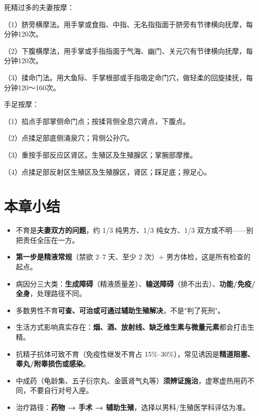 \documentclass[12pt,UTF8,openany]{ctexbook}
\begin{document}
死精过多的夫妻按摩：

（1）脐旁横摩法。用手掌或食指、中指、无名指指面于脐旁有节律横向抚摩，每分钟120次。

（2）下腹横摩法，用手掌或手指指面于气海、幽门、关元穴有节律横向抚摩，每分钟120次。

（3）揉命门法。用大鱼际、手掌根部或手指吸定命门穴，做轻柔的回旋揉抚，每分钟120～160次。

手足按摩：

（1）掐点手部掌侧命门点；按揉背侧全息穴肾点，下腹点。

（2）点揉足部底侧涌泉穴；背侧公孙穴。

（3）重按手部反应区肾区。生殖区及生殖腺区；掌腕部摩推。

（4）点揉足部反射区生殖区及生殖腺区，肾区；踩足底；擦足心。

\section{本章小结}

\begin{itemize}[leftmargin=2em,itemsep=0.3em]
  \item 不育是\textbf{夫妻双方的问题}，约 1/3 纯男方、1/3 纯女方、1/3 双方或不明——别把责任全压在一方。
  \item \textbf{第一步是精液常规}（禁欲 2–7 天、至少 2 次）+ 男方体检，这是所有检查的起点。
  \item 病因分三大类：\textbf{生成障碍}（精液质量差）、\textbf{输送障碍}（排不出去）、\textbf{功能/免疫/全身}，处理路径不同。
  \item 多数男性不育\textbf{可查、可治或可通过辅助生殖解决}，不是"判了死刑"。
  \item 生活方式影响真实存在：\textbf{烟、酒、放射线、缺乏维生素与微量元素}都会打击生精。
  \item 抗精子抗体可致不育（免疫性继发不育占 15\%–30\%），常见诱因是\textbf{精道阻塞、睾丸/附睾损伤或感染}。
  \item 中成药（龟龄集、五子衍宗丸、金匮肾气丸等）\textbf{须辨证施治}，虚寒虚热用药不同，不要自行对号入座。
  \item 治疗路径：\textbf{药物 → 手术 → 辅助生殖}，选择以男科/生殖医学科评估为准。
\end{itemize}
\end{document}
